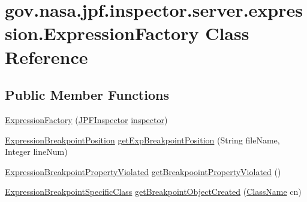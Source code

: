 \hypertarget{classgov_1_1nasa_1_1jpf_1_1inspector_1_1server_1_1expression_1_1_expression_factory}{}\section{gov.\+nasa.\+jpf.\+inspector.\+server.\+expression.\+Expression\+Factory Class Reference}
\label{classgov_1_1nasa_1_1jpf_1_1inspector_1_1server_1_1expression_1_1_expression_factory}
\subsection*{Public Member Functions}
\begin{DoxyCompactItemize}
\item 
\hyperlink{classgov_1_1nasa_1_1jpf_1_1inspector_1_1server_1_1expression_1_1_expression_factory_a6eaa004cd80457616f4c1751896af0d5}{Expression\+Factory} (\hyperlink{classgov_1_1nasa_1_1jpf_1_1inspector_1_1server_1_1jpf_1_1_j_p_f_inspector}{J\+P\+F\+Inspector} \hyperlink{classgov_1_1nasa_1_1jpf_1_1inspector_1_1server_1_1expression_1_1_expression_factory_a3a9c2a8f91b31b8105ed93e509fab8ca}{inspector})
\item 
\hyperlink{classgov_1_1nasa_1_1jpf_1_1inspector_1_1server_1_1expression_1_1expressions_1_1_expression_breakpoint_position}{Expression\+Breakpoint\+Position} \hyperlink{classgov_1_1nasa_1_1jpf_1_1inspector_1_1server_1_1expression_1_1_expression_factory_a631b1ba3019f72cc97a19376f47ecfb5}{get\+Exp\+Breakpoint\+Position} (String file\+Name, Integer line\+Num)
\item 
\hyperlink{classgov_1_1nasa_1_1jpf_1_1inspector_1_1server_1_1expression_1_1expressions_1_1_expression_breakpoint_property_violated}{Expression\+Breakpoint\+Property\+Violated} \hyperlink{classgov_1_1nasa_1_1jpf_1_1inspector_1_1server_1_1expression_1_1_expression_factory_ac6ae89f5e7d4bc15db89e83729705838}{get\+Breakpooint\+Property\+Violated} ()
\item 
\hyperlink{classgov_1_1nasa_1_1jpf_1_1inspector_1_1server_1_1expression_1_1expressions_1_1_expression_breakpoint_specific_class}{Expression\+Breakpoint\+Specific\+Class} \hyperlink{classgov_1_1nasa_1_1jpf_1_1inspector_1_1server_1_1expression_1_1_expression_factory_a8a39baba147e3f7159925acc067e3235}{get\+Breakpoint\+Object\+Created} (\hyperlink{classgov_1_1nasa_1_1jpf_1_1inspector_1_1utils_1_1expressions_1_1_class_name}{Class\+Name} cn)

\end{DoxyCompactItemize}
